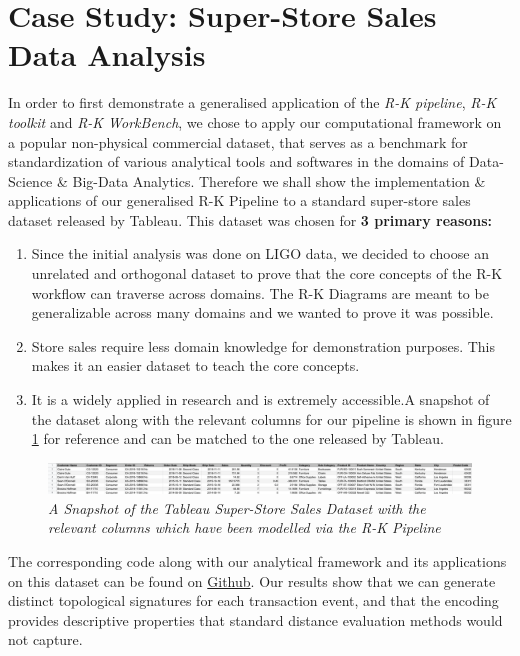 \section{Case Study: Super-Store Sales Data Analysis}
\label{sec:store_sales_section}

In order to first demonstrate a generalised application of the \textit{R-K pipeline}, \textit{R-K toolkit} and \textit{R-K WorkBench}, we chose to apply our computational framework on a popular non-physical commercial dataset, that serves as a benchmark for standardization of various analytical tools and softwares in the domains of Data-Science \& Big-Data Analytics. Therefore we shall show the implementation \& applications of our generalised R-K Pipeline to a standard super-store sales dataset released by Tableau.\cite{TableauSuperStore} This dataset was chosen for \textbf{3 primary reasons:}

\begin{enumerate}
        \item{Since the initial analysis was done on LIGO data, we decided to choose an unrelated and orthogonal dataset to prove that the core concepts of the R-K workflow can traverse across domains. The R-K Diagrams are meant to be generalizable across many domains and we wanted to prove it was possible.}
        \item{Store sales require less domain knowledge for demonstration purposes. This makes it an easier dataset to teach the core concepts.}
        \item{It is a widely applied in research and is extremely accessible.A snapshot of the dataset along with the relevant columns for our pipeline is shown in figure \ref{fig:sample store sales dataset} for reference and can be matched to the one released by  Tableau.\cite{TableauSuperStore}}
\end{enumerate}

\begin{figure}[t]
	\centering
        \includegraphics[width=1\textwidth]{images/store_sales_dataset.png}
	\caption{\textit{A Snapshot of the Tableau Super-Store Sales Dataset with the relevant columns which have been modelled via the R-K Pipeline }}
	\label{fig:sample store sales dataset}
\end{figure}

The corresponding code along with our analytical framework and its applications on this dataset can be found on \href{https://github.com/andorsk/store_sales}{Github}. Our results show that we can generate distinct topological signatures for each transaction event, and that the encoding provides descriptive properties that standard distance evaluation methods would not capture.

